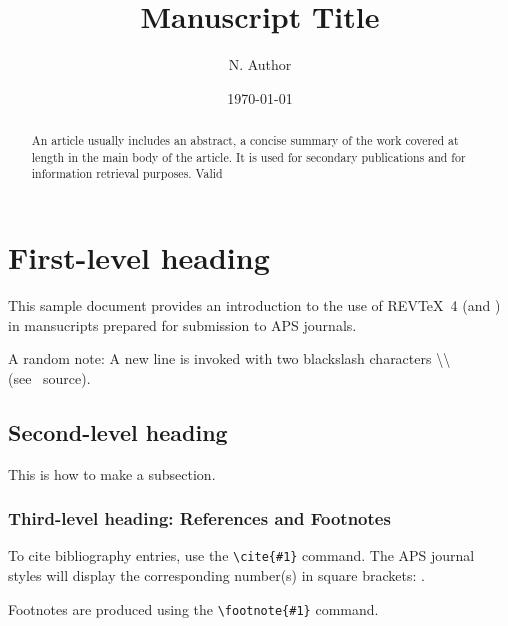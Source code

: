 \documentclass[aps,12pt]{revtex4}
\begin{document}
\title{Manuscript Title}

\author{N. Author}


\date{\today}


\begin{abstract}
An article usually includes an abstract, a concise summary of the work
covered at length in the main body of the article. It is used for
secondary publications and for information retrieval purposes. Valid
\end{abstract}

\maketitle

\section{First-level heading}
\label{sec:level1}

This sample document provides an introduction to the use of REV\TeX~4
(and \LaTeXe) in mansucripts prepared for submission to APS
journals.

A random note: A new line is 
invoked with two blackslash characters
\textbackslash\textbackslash
\\ (see \LaTeXe\ source). 

\subsection{Second-level heading}

This is how to make a subsection.

\subsubsection{Third-level heading: References and Footnotes}

To cite bibliography entries, use the \verb+\cite{#1}+ command. The APS
journal styles will display the corresponding number(s) in square
brackets: \cite{ref:feyn54,ref:witten2001}.

Footnotes are produced using the \verb+\footnote{#1}+ command.
\end{document}
